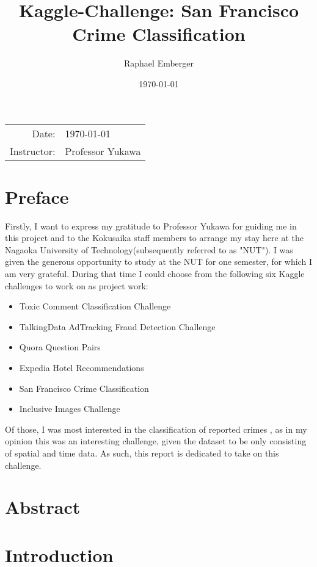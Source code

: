 \documentclass[titlepage]{article}
\author{Raphael Emberger}
\title{Kaggle-Challenge: San Francisco Crime Classification}
\date{\today}
\begin{document}
\maketitle

\begin{center}
\begin{tabular}{r l}
Date: & \today\\
Instructor: & Professor Yukawa
\end{tabular}
\end{center}

\tableofcontents
\pagebreak

\section{Preface}\label{s:preface}
Firstly, I want to express my gratitude to Professor Yukawa for guiding me in this project and to the Kokusaika staff members to arrange my stay here at the Nagaoka University of Technology(subsequently referred to as "NUT").
I was given the generous opportunity to study at the NUT for one semester, for which I am very grateful. During that time I could choose from the following six Kaggle challenges to work on as project work:
\begin{itemize}
\item Toxic Comment Classification Challenge \citep{kgl_toxic_comment}
\item TalkingData AdTracking Fraud Detection Challenge \citep{kgl_talking_data}
\item Quora Question Pairs \citep{kgl_quora}
\item Expedia Hotel Recommendations \citep{kgl_expedia}
\item San Francisco Crime Classification \citep{kgl_sf_crime}
\item Inclusive Images Challenge \citep{kgl_inclusive_images}
\end{itemize}
Of those, I was most interested in the classification of reported crimes \citep{kgl_sf_crime}, as in my opinion this was an interesting challenge, given the dataset to be only consisting of spatial and time data. As such, this report is dedicated to take on this challenge.

\pagebreak
\section{Abstract}\label{s:abstract}

\pagebreak
\section{Introduction}\label{s:intro}
\end{document}
